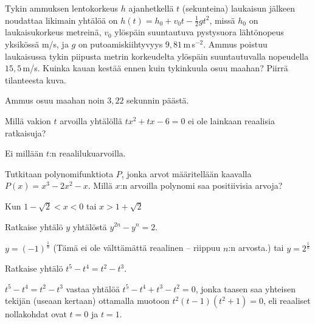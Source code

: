  \begin{tehtava}
Tykin ammuksen lentokorkeus $h$ ajanhetkellä $t$ (sekunteina) laukaisun jälkeen noudattaa likimain yhtälöä on $h(t)=h_0+v_0t-\frac{1}{2}gt^2$, missä $h_0$ on laukaisukorkeus metreinä, $v_0$ ylöspäin suuntautuva pystysuora lähtönopeus yksikössä m/s, ja $g$ on putoamiskiihtyvyys $9,81$\,m\,s$^{-2}$. Ammus poistuu laukaisussa tykin piipusta metrin korkeudelta ylöspäin suuntautuvalla nopeudella $15,5$\,m/s. Kuinka kauan kestää ennen kuin tykinkuula osuu maahan? Piirrä tilanteesta kuva.
	\begin{vastaus}
	Ammus osuu maahan noin $3,22$ sekunnin päästä. %
	\end{vastaus}
\end{tehtava}

\begin{tehtava}
Millä vakion $t$ arvoilla yhtälöllä $tx^2+tx-6=0$ ei ole lainkaan reaalisia ratkaisuja?
	\begin{vastaus}
Ei millään $t$:n reaalilukuarvoilla.
	\end{vastaus}
\end{tehtava}

\begin{tehtava}
Tutkitaan polynomifunktiota $P$, jonka arvot määritellään kaavalla $P(x)=x^3-2x^2-x$. Millä $x$:n arvoilla polynomi saa positiivisia arvoja?
	\begin{vastaus}
	Kun $1-\sqrt{2}<x<0$ tai $x>1+\sqrt{2}$
	\end{vastaus}
\end{tehtava}

\begin{tehtava}
Ratkaise yhtälö $y$ yhtälöstä $y^{2n}-y^n=2$.
	\begin{vastaus}
$y=(-1)^{\frac{1}{n}}$ (Tämä ei ole välttämättä reaalinen -- riippuu $n$:n arvosta.) tai $y=2^{\frac{1}{n}}$
	\end{vastaus}
\end{tehtava}

\begin{tehtava}
Ratkaise yhtälö $t^5-t^4=t^2-t^3$.
	\begin{vastaus}
$t^5-t^4=t^2-t^3$ vastaa yhtälöä $t^5-t^4+t^3-t^2=0$, jonka taasen saa yhteisen tekijän (useaan kertaan) ottamalla muotoon $t^2(t-1)(t^2+1)=0$, eli reaaliset nollakohdat ovat $t=0$ ja $t=1$.
	\end{vastaus}
\end{tehtava}

